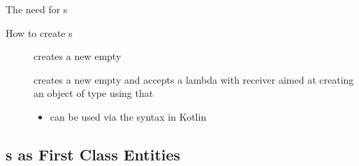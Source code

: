 \documentclass[handout]{beamer}
\begin{document}
\begin{frame}[allowframebreaks]{The need for s}
    \begin{block}{How to create s}
        \begin{description}
            \item[] creates a new empty 

            \item[] creates a new empty  and accepts a lambda with receiver aimed at creating an object of type  using that 
            \begin{itemize}
                \item can be used via the syntax  in Kotlin
            \end{itemize}
        \end{description}
    \end{block}

    \framebreak

\end{frame}

\subsection{s as First Class Entities}
\end{document}
